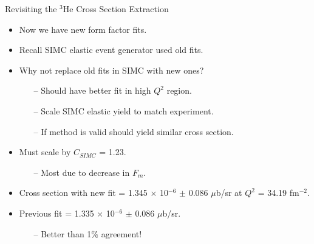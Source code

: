 \documentclass[10pt]{beamer}
\begin{document}
\begin{frame}[fragile]{Revisiting the $^3$He Cross Section Extraction}

	\begin{itemize}
		\item {}\alert{Now we have new form factor fits}.
		\pause
		\item Recall \alert{SIMC} elastic event generator \alert{used old fits}.
		\pause 
		\item Why not \alert{replace old fits} in SIMC \alert{with new ones}?
		\begin{itemize}
			\item[--] Should have better fit in high $Q^2$ region.
			\item[--] Scale SIMC elastic yield to match experiment.
			\item[--] If method is valid should yield similar cross section.
		\end{itemize}
		\pause
		\item Must scale by \alert{$C_{SIMC}$ = 1.23}.
			\begin{itemize}
				\item[--] Most due to decrease in $F_m$.
			\end{itemize}
		\item Cross section with new fit = \alert{1.345 $\times$ 10$^{-6}$ $\pm$ 0.086 $\mu$b/sr} at \alert{$Q^2$ = 34.19 fm$^{-2}$}.
		\pause
		\item Previous fit = \alert{1.335 $\times$ 10$^{-6}$ $\pm$ 0.086 $\mu$b/sr}.
		\begin{itemize}
			\item[--] \alert{Better than 1$\%$ agreement}!
		\end{itemize}
	\end{itemize}

\end{frame}
\end{document}
